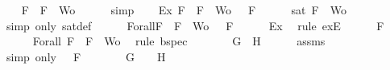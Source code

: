 \begin{isabellebody}
\ \ \isamarkupfalse%
\ {\isachardoublequoteopen}F\ {\isasymin}\ {\isacharbraceleft}F{\isacharbraceright}\ {\isasymunion}\ Wo{\isachardoublequoteclose}\isanewline
\ \ \ \ \isamarkupfalse%
\ simp\isanewline
\ \ \isamarkupfalse%
\ Ex{}{\isacharcolon}{\isachardoublequoteopen}{\isasymexists}{\isasymA}{\isachardot}\ {\isasymforall}F\ {\isasymin}\ {\isacharparenleft}{\isacharbraceleft}F{\isacharbraceright}\ {\isasymunion}\ Wo{\isacharparenright}{\isachardot}\ {\isasymA}\ {\isasymTurnstile}\ F{\isachardoublequoteclose}\isanewline
\ \ \ \ \isamarkupfalse%
\ {\isacartoucheopen}sat\ {\isacharparenleft}{\isacharbraceleft}F{\isacharbraceright}\ {\isasymunion}\ Wo{\isacharparenright}{\isacartoucheclose}\ \isamarkupfalse%
\ {\isacharparenleft}simp\ only{\isacharcolon}\ sat{\isacharunderscore}def{\isacharparenright}\isanewline
\ \ \isamarkupfalse%
\ {\isasymA}\ \ Forall{}{\isacharcolon}{\isachardoublequoteopen}{\isasymforall}F\ {\isasymin}\ {\isacharparenleft}{\isacharbraceleft}F{\isacharbraceright}\ {\isasymunion}\ Wo{\isacharparenright}{\isachardot}\ {\isasymA}\ {\isasymTurnstile}\ F{\isachardoublequoteclose}\isanewline
\ \ \ \ \isamarkupfalse%
\ Ex{}\ \isamarkupfalse%
\ {\isacharparenleft}rule\ exE{\isacharparenright}\isanewline
\ \ \isamarkupfalse%
\ {\isachardoublequoteopen}{\isasymA}\ {\isasymTurnstile}\ F{\isachardoublequoteclose}\isanewline
\ \ \ \ \isamarkupfalse%
\ Forall{}\ {\isacartoucheopen}F\ {\isasymin}\ {\isacharbraceleft}F{\isacharbraceright}\ {\isasymunion}\ Wo{\isacartoucheclose}\ \isamarkupfalse%
\ {\isacharparenleft}rule\ bspec{\isacharparenright}\isanewline
\ \ \isamarkupfalse%
\ \isamarkupfalse%
\ {\isachardoublequoteopen}{\isasymA}\ {\isasymTurnstile}\ {\isacharparenleft}G\ \isactrlbold {\isasymrightarrow}\ H{\isacharparenright}{\isachardoublequoteclose}\isanewline
\ \ \ \ \isamarkupfalse%
\ assms{\isacharparenleft}{}{\isacharparenright}\ \isamarkupfalse%
\ {\isacharparenleft}simp\ only{\isacharcolon}\ {\isacartoucheopen}{\isasymA}\ {\isasymTurnstile}\ F{\isacartoucheclose}{\isacharparenright}\isanewline
\ \ \isamarkupfalse%
\ \isamarkupfalse%
\ {\isachardoublequoteopen}{\isasymA}\ {\isasymTurnstile}\ G\ {\isasymlongrightarrow}\ {\isasymA}\ {\isasymTurnstile}\ H{\isachardoublequoteclose}\isanewline

\end{isabellebody}
